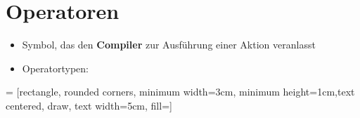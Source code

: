 
\section{Operatoren}
\begin{frame}
    \slidehead

    \begin{itemize}
        \item Symbol, das den \textbf{Compiler} zur Ausführung einer Aktion veranlasst
        \item Operatortypen:
    \end{itemize}
     = [rectangle, rounded corners, minimum width=3cm, minimum height=1cm,text centered, draw, text width=5cm, fill=]
    \centering
\end{frame}

